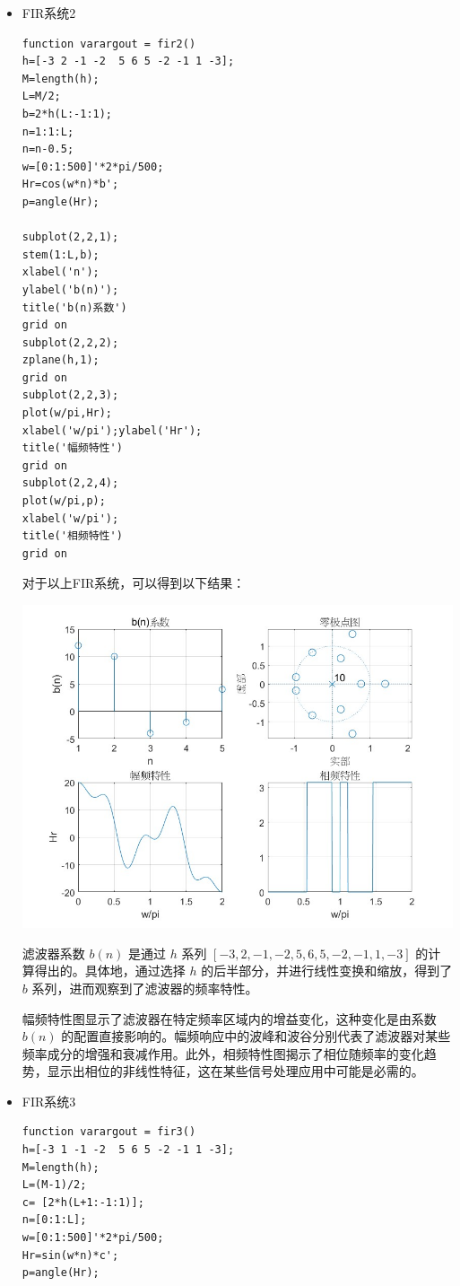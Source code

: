 \documentclass[a4paper,12pt]{article}
\begin{document}
\begin{itemize}
    \item FIR系统2
    
    \begin{lstlisting}
function varargout = fir2()
h=[-3 2 -1 -2  5 6 5 -2 -1 1 -3];
M=length(h);
L=M/2;
b=2*h(L:-1:1);
n=1:1:L;
n=n-0.5;
w=[0:1:500]'*2*pi/500;
Hr=cos(w*n)*b';
p=angle(Hr);

subplot(2,2,1);
stem(1:L,b); 
xlabel('n');
ylabel('b(n)');
title('b(n)系数')
grid on
subplot(2,2,2);
zplane(h,1);
grid on
subplot(2,2,3); 
plot(w/pi,Hr);
xlabel('w/pi');ylabel('Hr');
title('幅频特性')
grid on
subplot(2,2,4);
plot(w/pi,p); 
xlabel('w/pi');
title('相频特性')
grid on

    \end{lstlisting}

对于以上FIR系统，可以得到以下结果：
    
\centering 
\includegraphics[width=0.8\linewidth]{images/3_Verify/fir2.jpg}
\justifying

滤波器系数 \( b(n) \) 是通过 \( h \) 系列 \( [-3, 2, -1, -2, 5, 6, 5, -2, -1, 1, -3] \) 的计算得出的。具体地，通过选择 \( h \) 的后半部分，并进行线性变换和缩放，得到了 \( b \) 系列，进而观察到了滤波器的频率特性。

幅频特性图显示了滤波器在特定频率区域内的增益变化，这种变化是由系数 \( b(n) \) 的配置直接影响的。幅频响应中的波峰和波谷分别代表了滤波器对某些频率成分的增强和衰减作用。此外，相频特性图揭示了相位随频率的变化趋势，显示出相位的非线性特征，这在某些信号处理应用中可能是必需的。


    \item FIR系统3

    \begin{lstlisting}
function varargout = fir3()
h=[-3 1 -1 -2  5 6 5 -2 -1 1 -3];
M=length(h);
L=(M-1)/2;
c= [2*h(L+1:-1:1)];
n=[0:1:L];
w=[0:1:500]'*2*pi/500;
Hr=sin(w*n)*c';
p=angle(Hr);


\end{lstlisting}
\end{itemize}
\end{document}
